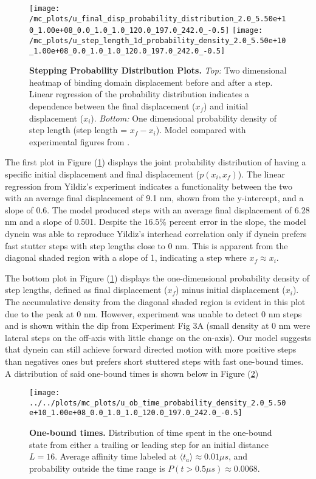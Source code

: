 \begin{figure}[H]
	\centering
	\texttt{[image: /mc\_plots/u\_final\_disp\_probability\_distribution\_2.0\_5.50e+10\_1.00e+08\_0.0\_1.0\_1.0\_120.0\_197.0\_242.0\_-0.5]}
	\texttt{[image: /mc\_plots/u\_step\_length\_1d\_probability\_density\_2.0\_5.50e+10\_1.00e+08\_0.0\_1.0\_1.0\_120.0\_197.0\_242.0\_-0.5]}
	\caption[Final Displacement Probability Distribution]{\textbf{Stepping Probability Distribution Plots.} \textit{Top:} Two dimensional heatmap of binding domain displacement before and after a step. Linear regression of the probability distribution indicates a dependence between the final displacement ($x_f$) and initial displacement ($x_i$). \textit{Bottom:} One dimensional probability density of step length (step length = $x_f-x_i$). Model compared with experimental figures from \citep{Dewitt2012}.} 
	\label{fig:DataFitYildiz}
\end{figure}
\newpage
The first plot in Figure (\ref{fig:DataFitYildiz}) displays the joint probability distribution of having a specific initial displacement and final displacement ($p(x_i,x_f)$). The linear regression from Yildiz's experiment indicates a functionality between the two with an average final displacement of 9.1 nm, shown from the y-intercept, and a slope of 0.6. The model produced steps with an average final displacement of 6.28 nm and a slope of 0.501. Despite the $16.5\%$ percent error in the slope, the model dynein was able to reproduce Yildiz's interhead correlation only if dynein prefers fast stutter steps with step lengths close to 0 nm. This is apparent from the diagonal shaded region with a slope of 1, indicating a step where $x_f\approx x_i$.


The bottom plot in Figure (\ref{fig:DataFitYildiz}) displays the one-dimensional probability density of step lengths, defined as final displacement ($x_f$) minus initial displacement ($x_i$). The accumulative density from the diagonal shaded region is evident in this plot due to the peak at 0 nm. However, experiment was unable to detect 0 nm steps and is shown within the dip from Experiment Fig 3A (small density at 0 nm were lateral steps on the off-axis with little change on the on-axis). Our model suggests that dynein can still achieve forward directed motion with more positive steps than negatives ones but prefers short stuttered steps with fast one-bound times. A distribution of said one-bound times is shown below in Figure (\ref{fig:OBtime}) 

\begin{figure}[H]
	\centering
	\texttt{[image: ../../plots/mc\_plots/u\_ob\_time\_probability\_density\_2.0\_5.50e+10\_1.00e+08\_0.0\_1.0\_1.0\_120.0\_197.0\_242.0\_-0.5]}
	\caption[One-bound times]{\textbf{One-bound times.} Distribution of time spent in the one-bound state from either a trailing or leading step for an initial distance $L=16$. Average affinity time labeled at $\langle t_a \rangle \approx 0.01 \mu s$, and probability outside the time range is $P(t>0.5\mu s) \approx 0.0068$.}
	\label{fig:OBtime}
\end{figure}

